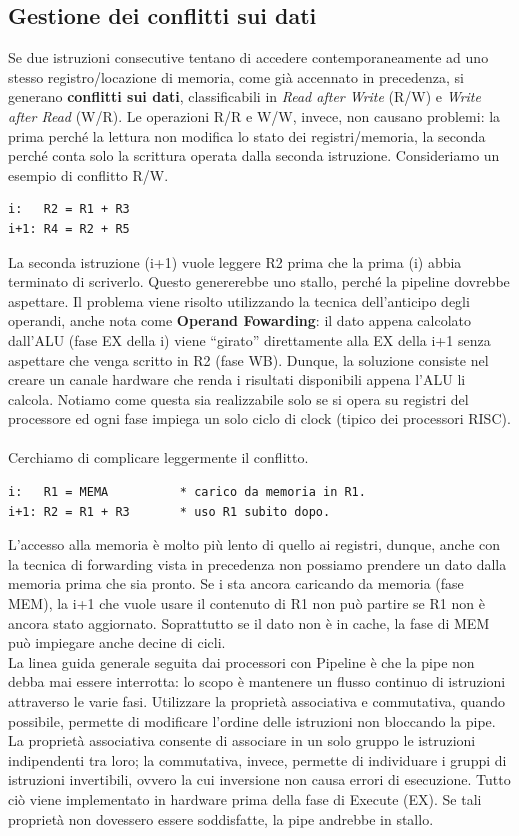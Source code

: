 \subsection{Gestione dei conflitti sui dati}
Se due istruzioni consecutive tentano di accedere contemporaneamente ad uno stesso registro/locazione di memoria, come già accennato in precedenza, si generano \textbf{conflitti sui dati}, classificabili in \textit{Read after Write} (R/W) e \textit{Write after Read} (W/R). Le operazioni R/R e W/W, invece, non causano problemi: la prima perché la lettura non modifica lo stato dei registri/memoria, la seconda perché conta solo la scrittura operata dalla seconda istruzione. Consideriamo un esempio di conflitto R/W.
\begin{lstlisting}
i:   R2 = R1 + R3  
i+1: R4 = R2 + R5
\end{lstlisting}
La seconda istruzione (i+1) vuole leggere R2 prima che la prima (i) abbia terminato di scriverlo. Questo genererebbe uno stallo, perché la pipeline dovrebbe aspettare. Il problema viene risolto utilizzando la tecnica dell'anticipo degli operandi, anche nota come \textbf{Operand Fowarding}: il dato appena calcolato dall’ALU (fase EX della i) viene “girato” direttamente alla EX della i+1 senza aspettare che venga scritto in R2 (fase WB). Dunque, la soluzione consiste nel creare un canale hardware che renda i risultati disponibili appena l’ALU li calcola. Notiamo come questa sia realizzabile solo se si opera su registri del processore ed ogni fase impiega un solo ciclo di clock (tipico dei processori RISC).  
\\
\\
Cerchiamo di complicare leggermente il conflitto.
\begin{lstlisting}
i:   R1 = MEMA          * carico da memoria in R1.
i+1: R2 = R1 + R3       * uso R1 subito dopo.
\end{lstlisting}
L'accesso alla memoria è molto più lento di quello ai registri, dunque, anche con la tecnica di forwarding vista in precedenza non possiamo prendere un dato dalla memoria prima che sia pronto. Se i sta ancora caricando da memoria (fase MEM), la i+1 che vuole usare il contenuto di R1 non può partire se R1 non è ancora stato aggiornato. Soprattutto se il dato non è in cache, la fase di MEM può impiegare anche decine di cicli.
\\
La linea guida generale seguita dai processori con Pipeline è che la pipe non debba mai essere interrotta: lo scopo è mantenere un flusso continuo di istruzioni attraverso le varie fasi. Utilizzare la proprietà associativa e commutativa, quando possibile, permette di modificare l'ordine delle istruzioni non bloccando la pipe. La proprietà associativa consente di associare in un solo gruppo le istruzioni indipendenti tra loro; la commutativa, invece, permette di individuare i gruppi di istruzioni invertibili, ovvero la cui inversione non causa errori di esecuzione. Tutto ciò viene implementato in hardware prima della fase di Execute (EX). Se tali proprietà non dovessero essere soddisfatte, la pipe andrebbe in stallo.
